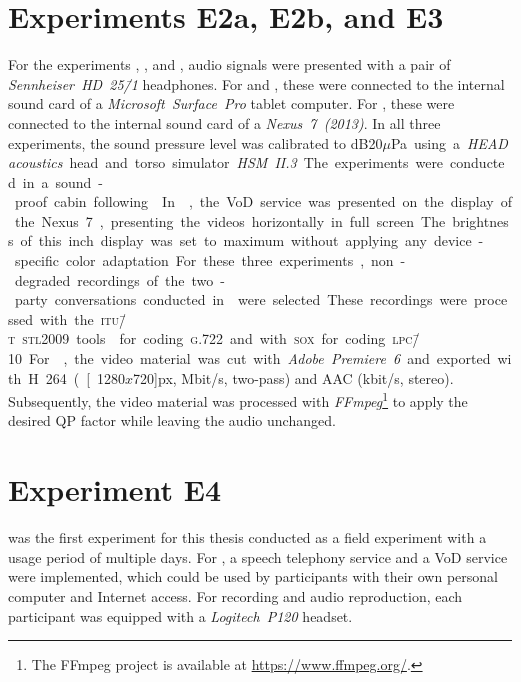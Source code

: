 \section{Experiments E2a, E2b, and E3}
For the experiments \EIIa{}, \EIIb{}, and , audio signals were presented with a pair of \emph{Sennheiser~HD~25\=/1} headphones.
For \EIIa{} and , these were connected to the internal sound card of a \emph{Microsoft~Surface~Pro} tablet computer.
For \EIIb{}, these were connected to the internal sound card of a \emph{Nexus~7~(2013)}.
In all three experiments, the sound pressure level was calibrated to \unit[75]{dB20$\mu$Pa} using a \emph{HEAD acoustics} head and torso simulator \emph{HSM~II.3}.
The experiments were conducted in a sound-proof cabin following \citet{itu-t_recommendation_p.800_methods_1996}.
In \EIIb{}, the \ac{VoD} service was presented on the display of the Nexus~7, presenting the videos horizontally in full screen.
The brightness of this \unit[7]{inch} display was set to maximum without applying any device-specific color adaptation.

For these three experiments, non-degraded recordings of the two-party conversations conducted in  were selected.
These recordings were processed with the \textsc{\lowercase{ITU\=/T}~\lowercase{STL2009}} tools \citep{itu-t_recommendation_g.191_software_2010} for coding \textsc{\lowercase{G.722}} and with \textsc{\lowercase{SOX}} for coding \textsc{\lowercase{LPC\=/10}}.
For \EIIb{}, the video material was cut with \emph{Adobe~Premiere~6} and exported with H.264 (\unit[1280$x$720]{px}, \unit[5]{Mbit/s}, two-pass) and \acs{AAC} (\unit[448]{kbit/s}, stereo).
Subsequently, the video material was processed with \emph{FFmpeg}\footnote{The FFmpeg project is available at \url{https://www.ffmpeg.org/}.} to apply the desired \acs{QP} factor while leaving the audio unchanged.

\section{Experiment E4}
 was the first experiment for this thesis conducted as a field experiment with a usage period of multiple days.
For , a speech telephony service and a \ac{VoD} service were implemented, which could be used by participants with their own personal computer and Internet access.
For recording and audio reproduction, each participant was equipped with a \emph{Logitech~P120} headset.

